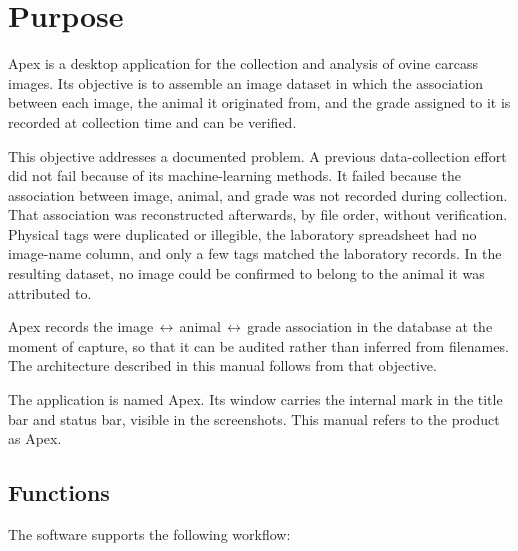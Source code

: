 \chapter{Purpose}


\vspace{4pt}
Apex is a desktop application for the collection and analysis of ovine carcass
images. Its objective is to assemble an image dataset in which the association
between each image, the animal it originated from, and the grade assigned to it is
recorded at collection time and can be verified.

This objective addresses a documented problem. A previous data-collection effort
did not fail because of its machine-learning methods. It failed because the
association between image, animal, and grade was not recorded during collection.
That association was reconstructed afterwards, by file order, without
verification. Physical tags were duplicated or illegible, the laboratory
spreadsheet had no image-name column, and only a few tags matched the laboratory
records. In the resulting dataset, no image could be confirmed to belong to the
animal it was attributed to.

\begin{note}[title={Design objective}]
Apex records the image\,$\leftrightarrow$\,animal\,$\leftrightarrow$\,grade
association in the database at the moment of capture, so that it can be audited
rather than inferred from filenames. The architecture described in this manual
follows from that objective.
\end{note}

\begin{note}[title={A note on the name}]
The application is named Apex. Its window carries the internal mark 
in the title bar and status bar, visible in the screenshots. This manual refers to
the product as Apex.
\end{note}

\section{Functions}

The software supports the following workflow:


